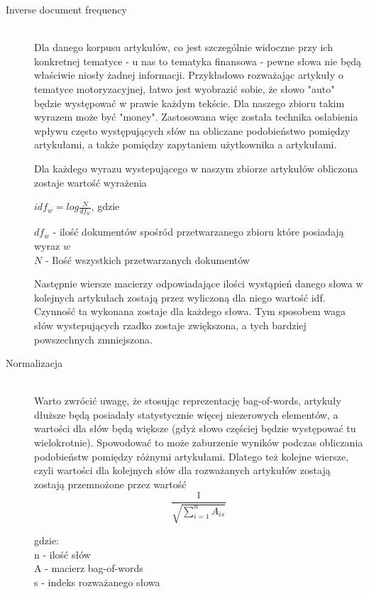 \begin{description}
  \item[Inverse document frequency] \hfill \\
Dla danego korpusu artykułów, co jest szczególnie widoczne przy ich konkretnej tematyce - u nas to tematyka finansowa - pewne słowa nie będą właściwie niosły żadnej informacji. Przykładowo rozważając artykuły o tematyce motoryzacyjnej, łatwo jest wyobrazić sobie, że słowo "auto" będzie występować w prawie każdym tekście. Dla naszego zbioru takim wyrazem może być "money". Zastosowana więc została technika osłabienia wpływu często występujących słów na obliczane podobieństwo pomiędzy artykułami, a także pomiędzy zapytaniem użytkownika a artykułami.

Dla każdego wyrazu wystepującego w naszym zbiorze artykułów obliczona zostaje wartość wyrażenia

\begin{center}
$idf_w = log\frac{N}{df_w}$, gdzie\\
\end{center}
$df_w$ - ilość dokumentów spośród przetwarzanego zbioru które posiadają wyraz $w$\\
$N$ - Ilość wszystkich przetwarzanych dokumentów 

Następnie wiersze macierzy odpowiadające ilości wystąpień danego słowa w kolejnych artykułach zostają przez wyliczoną dla niego wartość idf. Czynność ta wykonana zostaje dla każdego słowa. Tym sposobem waga słów wystepujących rzadko zostaje zwiększona, a tych bardziej powszechnych zmniejszona.

  \item[Normalizacja] \hfill \\
Warto zwrócić uwagę, że stosując reprezentację bag-of-words, artykuły dłuższe będą posiadały statystycznie więcej niezerowych elementów, a wartości dla słów będą większe (gdyż słowo częściej będzie występować tu wielokrotnie). Spowodować to może zaburzenie wyników podczas obliczania podobieństw pomiędzy różnymi artykułami. Dlatego też kolejne wiersze, czyli wartości dla kolejnych słów dla rozważanych artykułów zostają zostają przemnożone przez wartość
$$\frac{1}{\sqrt{\sum\limits_{i=1}^{n} A_{is}}}$$

gdzie:\\
n - ilość słów\\
A - macierz bag-of-words\\
s - indeks rozważanego słowa\\
 
\end{description}
